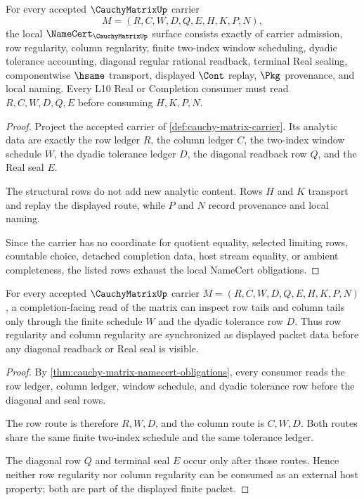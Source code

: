 \begin{theorem}
\label{thm:cauchy-matrix-namecert-obligations}
For every accepted $\CauchyMatrixUp$ carrier
$$
M=(R,C,W,D,Q,E,H,K,P,N),
$$
the local $\NameCert_{\CauchyMatrixUp}$ surface consists exactly of carrier admission, row regularity, column regularity, finite two-index window scheduling, dyadic tolerance accounting, diagonal regular rational readback, terminal Real sealing, componentwise $\hsame$ transport, displayed $\Cont$ replay, $\Pkg$ provenance, and local naming. Every L10 Real or Completion consumer must read $R,C,W,D,Q,E$ before consuming $H,K,P,N$.
\end{theorem}
\begin{proof}
Project the accepted carrier of \autoref{def:cauchy-matrix-carrier}. Its analytic data are exactly the row ledger $R$, the column ledger $C$, the two-index window schedule $W$, the dyadic tolerance ledger $D$, the diagonal readback row $Q$, and the Real seal $E$.

The structural rows do not add new analytic content. Rows $H$ and $K$ transport and replay the displayed route, while $P$ and $N$ record provenance and local naming.

Since the carrier has no coordinate for quotient equality, selected limiting rows, countable choice, detached completion data, host stream equality, or ambient completeness, the listed rows exhaust the local NameCert obligations.
\end{proof}

\begin{theorem}
\label{thm:cauchy-matrix-row-column-regularity}
For every accepted $\CauchyMatrixUp$ carrier $M=(R,C,W,D,Q,E,H,K,P,N)$, a completion-facing read of the matrix can inspect row tails and column tails only through the finite schedule $W$ and the dyadic tolerance row $D$. Thus row regularity and column regularity are synchronized as displayed packet data before any diagonal readback or Real seal is visible.
\end{theorem}
\begin{proof}
By \autoref{thm:cauchy-matrix-namecert-obligations}, every consumer reads the row ledger, column ledger, window schedule, and dyadic tolerance row before the diagonal and seal rows.

The row route is therefore $R,W,D$, and the column route is $C,W,D$. Both routes share the same finite two-index schedule and the same tolerance ledger.

The diagonal row $Q$ and terminal seal $E$ occur only after those routes. Hence neither row regularity nor column regularity can be consumed as an external host property; both are part of the displayed finite packet.
\end{proof}


